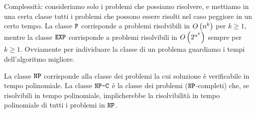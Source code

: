 Complessit\`a: consideriamo solo i problemi che possiamo risolvere, e mettiamo in una certa classe tutti i problemi che possono essere risolti nel caso peggiore in un certo tempo.
La classe $\texttt{P}$ corrisponde a problemi risolvibili in $O\left( {n^k} \right)$ per $k \ge 1$, mentre la classe $\texttt{EXP}$ corrisponde a problemi risolvibili in $O\left( {2^{n^k}} \right)$ sempre per $k \ge 1$.
Ovviamente per individuare la classe di un problema guardiamo i tempi dell'algoritmo migliore.

La classe $\texttt{NP}$ corrisponde alla classe dei problemi la cui soluzione \`e verificabile in tempo polinomiale.
La classe $\texttt{NP-C}$ \`e la classe dei problemi ($\texttt{NP}$-completi) che, se risolvibili in tempo polinomiale, implicherebbe la risolvibilit\`a in tempo polinomiale di tutti i problemi in $\texttt{NP}$.


